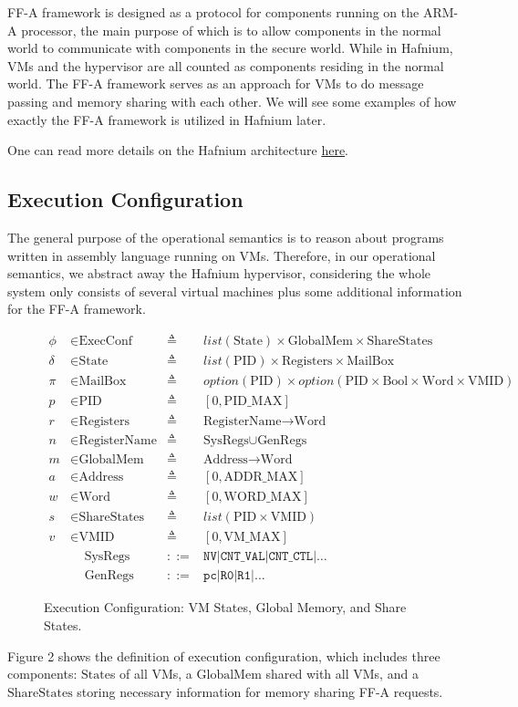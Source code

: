 \documentclass[a4paper]{article}
\newcommand*{\defined}{\triangleq}
\newcommand*{\maps}{\rightarrow}
\newcommand*{\derived}{::=}
\newcommand*{\CONF}{\text{ExecConf}}
\newcommand*{\STATE}{\text{State}}
\newcommand*{\MEM}{\text{GlobalMem}}
\newcommand*{\SSS}{\text{ShareStates}}
\newcommand*{\PID}{\text{PID}}
\newcommand*{\REGS}{\text{Registers}}
\newcommand*{\ADDR}{\text{Address}}
\newcommand*{\WORD}{\text{Word}}
\newcommand*{\VMID}{\text{VMID}}
\newcommand*{\REGNAMES}{\text{RegisterName}}
\newcommand*{\MB}{\text{MailBox}}
\newcommand*{\PAMAX}{\text{ADDR\_MAX}}
\newcommand*{\PPIDMAX}{\text{PID\_MAX}}
\newcommand*{\PWMAX}{\text{WORD\_MAX}}
\newcommand*{\PVMMAX}{\text{VM\_MAX}}
\begin{document}
FF-A framework is designed as a protocol for components running on the ARM-A
processor, the main purpose of which is to allow components in the normal world
to communicate with components in the secure world. While in Hafnium, VMs and
the hypervisor are all counted as components residing in the normal world. The
FF-A framework serves as an approach for VMs to do message passing and
memory sharing with each other. We will see some examples of how exactly the
FF-A framework is utilized in Hafnium later.

One can read more details on the Hafnium architecture
\href{https://review.trustedfirmware.org/plugins/gitiles/hafnium/hafnium/+/HEAD/docs/Architecture.md}{here}.

\subsection{Execution Configuration}
 The general purpose of the operational
semantics is to reason about programs written in assembly language running on
VMs. Therefore, in our operational semantics, we abstract away the Hafnium
hypervisor, considering the whole system only consists of several virtual
machines plus some additional information for the FF-A framework.

\begin{figure}
  \begin{align*}
    \phi &\in \CONF &\defined &list(\STATE) \times \MEM \times \SSS \\
    \delta &\in \STATE &\defined &list(\PID) \times \REGS \times \MB \\
    \pi & \in \MB &\defined &option(\PID) \times option(\PID \times \text{Bool} \times \WORD \times \VMID) \\
    p & \in \PID &\defined  &[ 0, \PPIDMAX ] \\
    r & \in \REGS &\defined  &\REGNAMES \maps \WORD \\
    n & \in \REGNAMES &\defined &\text{SysRegs} \cup \text{GenRegs} \\
    m & \in \MEM &\defined  &\ADDR \maps \WORD \\
    a & \in \ADDR &\defined  &[ 0, \PAMAX ] \\
    w & \in \WORD &\defined  &[ 0, \PWMAX ] \\
    s & \in \SSS &\defined  &list(\PID \times \VMID) \\
    v & \in \VMID &\defined  &[ 0, \PVMMAX ] \\
      & \;\;\;\; \text{SysRegs} &\derived & \mathtt{NV} | \mathtt{CNT\_VAL} | \mathtt{CNT\_CTL} | \dots \\
      & \;\;\;\; \text{GenRegs} &\derived & \mathtt{pc} | \mathtt {R0} | \mathtt{R1} | \dots
  \end{align*}
  \caption{Execution Configuration: VM States, Global Memory, and Share States.}
\end{figure}
Figure 2 shows the definition of execution configuration, which includes three
components: $\STATE$s of all VMs, a $\MEM$ shared with all VMs, and a $\SSS$
storing necessary information for memory sharing FF-A requests.
\end{document}
